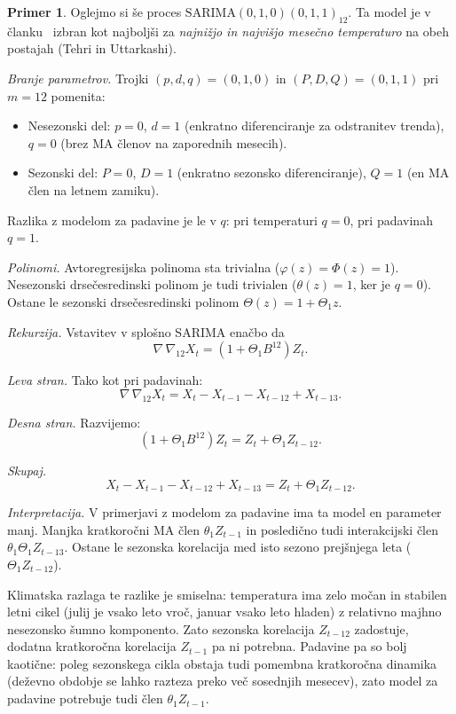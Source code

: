 \documentclass[11pt]{amsart}
\theoremstyle{definition}
\newtheorem{primer}[definicija]{Primer}
\theoremstyle{plain}
\begin{document}
\begin{primer}
    Oglejmo si še proces $\mathrm{SARIMA}(0,1,0)(0,1,1)_{12}$. Ta model je v 
    članku~\cite{dimri2020} izbran kot najboljši za \emph{najnižjo in najvišjo mesečno 
    temperaturo} na obeh postajah (Tehri in Uttarkashi).

    \emph{Branje parametrov.} Trojki $(p,d,q) = (0,1,0)$ in $(P,D,Q) = (0,1,1)$ pri $m = 12$ 
    pomenita:
    \begin{itemize}
        \item Nesezonski del: $p = 0$, $d = 1$ (enkratno diferenciranje za odstranitev trenda), 
              $q = 0$ (brez MA členov na zaporednih mesecih).
        \item Sezonski del: $P = 0$, $D = 1$ (enkratno sezonsko diferenciranje), 
              $Q = 1$ (en MA člen na letnem zamiku).
    \end{itemize}
    Razlika z modelom za padavine je le v $q$: pri temperaturi $q = 0$, pri padavinah $q = 1$.

    \emph{Polinomi.} Avtoregresijska polinoma sta trivialna ($\varphi(z) = \Phi(z) = 1$). 
    Nesezonski drsečesredinski polinom je tudi trivialen ($\theta(z) = 1$, ker je $q = 0$). 
    Ostane le sezonski drsečesredinski polinom $\Theta(z) = 1 + \Theta_1 z$.

    \emph{Rekurzija.} Vstavitev v splošno SARIMA enačbo da
    \[
        \nabla \, \nabla_{12} X_t = (1 + \Theta_1 B^{12}) Z_t.
    \]

    \emph{Leva stran.} Tako kot pri padavinah:
    \[
        \nabla \, \nabla_{12} X_t = X_t - X_{t-1} - X_{t-12} + X_{t-13}.
    \]

    \emph{Desna stran.} Razvijemo:
    \[
        (1 + \Theta_1 B^{12}) Z_t = Z_t + \Theta_1 Z_{t-12}.
    \]

    \emph{Skupaj.}
    \[
        X_t - X_{t-1} - X_{t-12} + X_{t-13} = Z_t + \Theta_1 Z_{t-12}.
    \]

    \emph{Interpretacija.} V primerjavi z modelom za padavine ima ta model en parameter manj. 
    Manjka kratkoročni MA člen $\theta_1 Z_{t-1}$ in posledično tudi interakcijski 
    člen $\theta_1 \Theta_1 Z_{t-13}$. Ostane le sezonska korelacija med isto sezono prejšnjega 
    leta ($\Theta_1 Z_{t-12}$).
    
    Klimatska razlaga te razlike je smiselna: temperatura ima zelo močan in stabilen letni 
    cikel (julij je vsako leto vroč, januar vsako leto hladen) z relativno majhno 
    nesezonsko šumno komponento. Zato sezonska korelacija $Z_{t-12}$ zadostuje, dodatna 
    kratkoročna korelacija $Z_{t-1}$ pa ni potrebna. Padavine pa so bolj kaotične: poleg 
    sezonskega cikla obstaja tudi pomembna kratkoročna dinamika (deževno obdobje se lahko 
    razteza preko več sosednjih mesecev), zato model za padavine potrebuje tudi 
    člen $\theta_1 Z_{t-1}$.
\end{primer}
\end{document}
